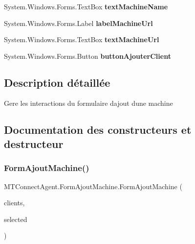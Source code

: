 \begin{DoxyCompactItemize}
System.\+Windows.\+Forms.\+Text\+Box {\bfseries text\+Machine\+Name}
\item 
\mbox{\label{class_m_t_connect_agent_1_1_form_ajout_machine_adc37ebc1401c7bc29fe5702178280574}} 
System.\+Windows.\+Forms.\+Label {\bfseries label\+Machine\+Url}
\item 
\mbox{\label{class_m_t_connect_agent_1_1_form_ajout_machine_a851fa7cd322a2229351b91d23e9a404d}} 
System.\+Windows.\+Forms.\+Text\+Box {\bfseries text\+Machine\+Url}
\item 
\mbox{\label{class_m_t_connect_agent_1_1_form_ajout_machine_a1506c93a74590c1b28038054ff108d77}} 
System.\+Windows.\+Forms.\+Button {\bfseries button\+Ajouter\+Client}
\end{DoxyCompactItemize}


\subsection{Description détaillée}
Gere les interactions du formulaire d\textquotesingle{}ajout d\textquotesingle{}une machine 



\subsection{Documentation des constructeurs et destructeur}
\mbox{\label{class_m_t_connect_agent_1_1_form_ajout_machine_acabb6332771d87cf6d8538abd9416de8}} 
\subsubsection{\texorpdfstring{Form\+Ajout\+Machine()}{FormAjoutMachine()}}
{\footnotesize\ttfamily M\+T\+Connect\+Agent.\+Form\+Ajout\+Machine.\+Form\+Ajout\+Machine (\begin{DoxyParamCaption}\item[{List$<$ \mbox{\hyperlink{class_m_t_connect_agent_1_1_model_1_1_client}{Client}} $>$}]{clients,  }\item[{Tree\+Node}]{selected }\end{DoxyParamCaption})\hspace{0.3cm}{\ttfamily [inline]}}



